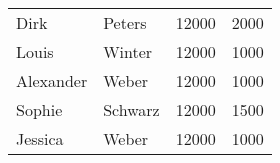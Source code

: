 \begin{enumerate}
\begin{center}
\begin{small}
{            }
            \tablehead{}
            \tabletail {
            }
            \begin{msoraclesql}
              \begin{supertabular}{llrr}
                Dirk & Peters & 12000 & 2000 \\
                Louis & Winter & 12000 & 1000 \\
                Alexander & Weber & 12000 & 1000 \\
                Sophie & Schwarz & 12000 & 1500 \\
                Jessica & Weber & 12000 & 1000 \\
              \end{supertabular}
            \end{msoraclesql}
          \end{small}
        \end{center}
      \end{enumerate}